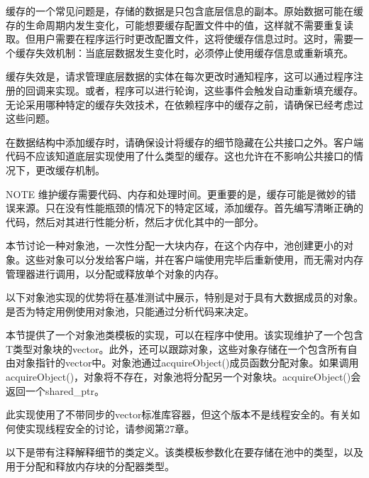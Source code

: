 缓存的一个常见问题是，存储的数据是只包含底层信息的副本。原始数据可能在缓存的生命周期内发生变化，可能想要缓存配置文件中的值，这样就不需要重复读取。但用户需要在程序运行时更改配置文件，这将使缓存信息过时。这时，需要一个缓存失效机制：当底层数据发生变化时，必须停止使用缓存信息或重新填充。

缓存失效是，请求管理底层数据的实体在每次更改时通知程序，这可以通过程序注册的回调来实现。或者，程序可以进行轮询，这些事件会触发自动重新填充缓存。无论采用哪种特定的缓存失效技术，在依赖程序中的缓存之前，请确保已经考虑过这些问题。

在数据结构中添加缓存时，请确保设计将缓存的细节隐藏在公共接口之外。客户端代码不应该知道底层实现使用了什么类型的缓存。这也允许在不影响公共接口的情况下，更改缓存机制。

\begin{myNotic}{NOTE}
维护缓存需要代码、内存和处理时间。更重要的是，缓存可能是微妙的错误来源。只在没有性能瓶颈的情况下的特定区域，添加缓存。首先编写清晰正确的代码，然后对其进行性能分析，然后才优化其中的一部分。
\end{myNotic}


本节讨论一种对象池，一次性分配一大块内存，在这个内存中，池创建更小的对象。这些对象可以分发给客户端，并在客户端使用完毕后重新使用，而无需对内存管理器进行调用，以分配或释放单个对象的内存。

以下对象池实现的优势将在基准测试中展示，特别是对于具有大数据成员的对象。是否为特定用例使用对象池，只能通过分析代码来决定。


本节提供了一个对象池类模板的实现，可以在程序中使用。该实现维护了一个包含T类型对象块的vector。此外，还可以跟踪对象，这些对象存储在一个包含所有自由对象指针的vector中。对象池通过acquireObject()成员函数分配对象。如果调用acquireObject()，对象将不存在，对象池将分配另一个对象块。acquireObject()会返回一个shared\_ptr。

此实现使用了不带同步的vector标准库容器，但这个版本不是线程安全的。有关如何使实现线程安全的讨论，请参阅第27章。

以下是带有注释解释细节的类定义。该类模板参数化在要存储在池中的类型，以及用于分配和释放内存块的分配器类型。

